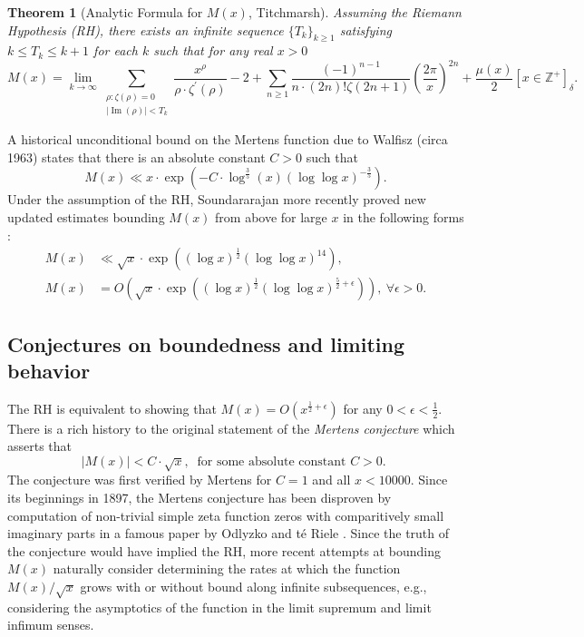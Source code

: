 \documentclass[11pt,reqno,a4letter]{article}
\numberwithin{figure}{section}
\numberwithin{table}{section}
\newcommand{\Iverson}[1]{\ensuremath{\left[#1\right]_{\delta}}}
\theoremstyle{plain}
\newtheorem{theorem}{Theorem}
\numberwithin{theorem}{section}
\theoremstyle{definition}
\renewcommand{\Im}{\operatorname{Im}}
\begin{document}
\begin{theorem}[Analytic Formula for $M(x)$, Titchmarsh] 
\label{theorem_MxMellinTransformInvFormula} 
Assuming the Riemann Hypothesis (RH), there exists an infinite sequence 
$\{T_k\}_{k \geq 1}$ satisfying $k \leq T_k \leq k+1$ for each $k$ 
such that for any real $x > 0$ 
\[
M(x) = \lim_{k \rightarrow \infty} 
     \sum_{\substack{\rho: \zeta(\rho) = 0 \\ |\Im(\rho)| < T_k}} 
     \frac{x^{\rho}}{\rho \cdot \zeta^{\prime}(\rho)} - 2 + 
     \sum_{n \geq 1} \frac{(-1)^{n-1}}{n \cdot (2n)! \zeta(2n+1)} 
     \left(\frac{2\pi}{x}\right)^{2n} + 
     \frac{\mu(x)}{2} \Iverson{x \in \mathbb{Z}^{+}}. 
\] 
\end{theorem} 

A historical unconditional bound on the Mertens function due to Walfisz (circa 1963) 
states that there is an absolute constant $C > 0$ such that 
$$M(x) \ll x \cdot \exp\left(-C \cdot \log^{\frac{3}{5}}(x) 
  (\log\log x)^{-\frac{3}{5}}\right).$$ 
Under the assumption of the RH, Soundararajan more recently proved new updated estimates 
bounding $M(x)$ from above for large $x$ in the following forms \cite{SOUND-MERTENS-ANNALS}: 
\begin{align*} 
M(x) & \ll \sqrt{x} \cdot \exp\left((\log x)^{\frac{1}{2}} (\log\log x)^{14}\right), \\ 
M(x) & = O\left(\sqrt{x} \cdot \exp\left( 
     (\log x)^{\frac{1}{2}} (\log\log x)^{\frac{5}{2}+\epsilon}\right)\right),\ 
     \forall \epsilon > 0. 
\end{align*} 

\subsection{Conjectures on boundedness and limiting behavior} 

The RH is equivalent to showing that 
$M(x) = O\left(x^{\frac{1}{2}+\epsilon}\right)$ for any 
$0 < \epsilon < \frac{1}{2}$. 
There is a rich history to the original statement of the \emph{Mertens conjecture} which 
asserts that 
\[ 
|M(x)| < C \cdot \sqrt{x},\ \text{ for some absolute constant $C > 0$. }
\] 
The conjecture was first verified by Mertens for $C = 1$ and all $x < 10000$. 
Since its beginnings in 1897, the Mertens conjecture has been disproven by computation 
of non-trivial simple zeta function zeros with comparitively small imaginary parts in a famous paper by 
Odlyzko and t\'{e} Riele \cite{ODLYZ-TRIELE}. 
Since the truth of the conjecture would have implied the RH, more recent attempts 
at bounding $M(x)$ naturally consider determining the rates at which the function 
$M(x) / \sqrt{x}$ grows with or without bound along infinite 
subsequences, e.g., considering the asymptotics of the function in the limit supremum and 
limit infimum senses. 
\end{document}
